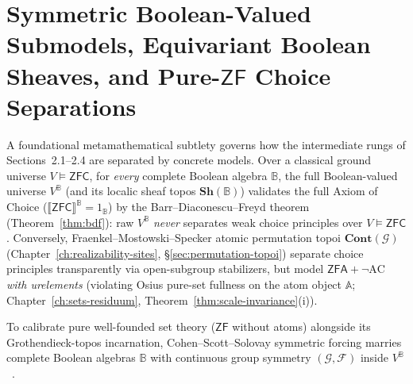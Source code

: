 \section{Symmetric Boolean-Valued Submodels, Equivariant Boolean Sheaves, and Pure-$\mathsf{ZF}$ Choice Separations}\label{sec:symmetric-bv-zf}

A foundational metamathematical subtlety governs how the intermediate rungs of Sections~2.1--2.4 are separated by concrete models. Over a classical ground universe $V \models \mathsf{ZFC}$, for \emph{every} complete Boolean algebra $\mathbb{B}$, the full Boolean-valued universe $V^{\mathbb{B}}$ (and its localic sheaf topos $\mathbf{Sh}(\mathbb{B})$) validates the full Axiom of Choice ($\llbracket \mathsf{ZFC} \rrbracket^{\mathbb{B}} = 1_{\mathbb{B}}$) by the Barr--Diaconescu--Freyd theorem (Theorem~\ref{thm:bdf}): raw $V^{\mathbb{B}}$ \emph{never} separates weak choice principles over $V \models \mathsf{ZFC}$. Conversely, Fraenkel--Mostowski--Specker atomic permutation topoi $\mathbf{Cont}(\mathcal{G})$ (Chapter~\ref{ch:realizability-sites}, \S\ref{sec:permutation-topoi}) separate choice principles transparently via open-subgroup stabilizers, but model $\mathsf{ZFA} + \neg\mathrm{AC}$ \emph{with urelements} (violating Osius pure-set fullness on the atom object $\mathbb{A}$; Chapter~\ref{ch:sets-residuum}, Theorem~\ref{thm:scale-invariance}(i)).

To calibrate pure well-founded set theory ($\mathsf{ZF}$ without atoms) alongside its Grothendieck-topos incarnation, Cohen--Scott--Solovay symmetric forcing marries complete Boolean algebras $\mathbb{B}$ with continuous group symmetry $(\mathcal{G}, \mathcal{F})$ inside $V^{\mathbb{B}}$~\cite[Ch.~5]{Jech73}.

